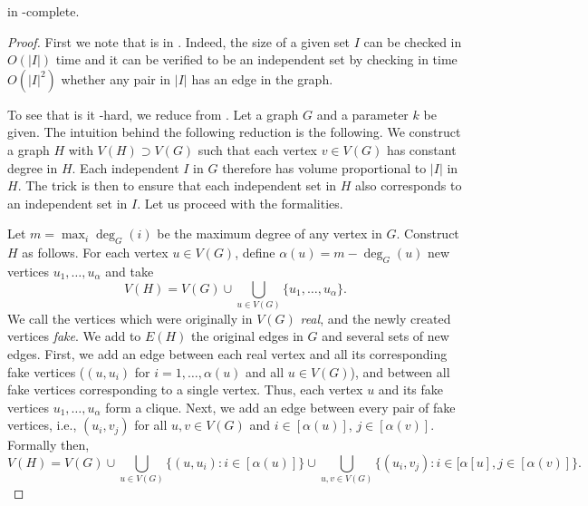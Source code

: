 \begin{lemma}
	\label{lem:vwis}
	\vwis in \NP-complete.
\end{lemma}
\begin{proof}
	First we note that \vwis is in \NP. Indeed, the size of a given set $I$  can be  checked  in  $O(|I|)$ time and it can be verified to be an independent set by checking in time $O(|I|^2)$ whether  any pair  in $|I|$ has an edge  in the  graph. 
	
	To see that is  it \NP-hard, we  reduce from \iset.  Let a graph  $G$ and  a parameter $k$ be  given. The intuition behind  the following reduction is the following. We construct a  graph  $H$ with  $V(H)\supset  V(G)$ such that each vertex $v\in  V(G)$ has constant degree  in $H$.  Each independent $I$ in $G$ therefore has volume proportional to $|I|$ in $H$. The trick is then to ensure that each independent set in  $H$ also corresponds to an  independent set  in $I$. Let us proceed with the formalities. 
	
	Let $m=\max_i\deg_G(i)$  be the maximum degree of any vertex in $G$. Construct $H$ as follows. For each vertex $u\in V(G)$,  define  $\alpha(u)=m-\deg_G(u)$ new vertices  $u_1,\dots,u_\alpha$ and take \[V(H)=V(G)\cup \bigcup_{u\in V(G)} \{u_1,\dots,u_\alpha\}.\]  
	We call the vertices which  were originally in $V(G)$ \emph{real},  and the  newly created vertices \emph{fake}. We  add to $E(H)$ the original  edges in $G$ and several sets  of new  edges. First, we add an edge  between  each real  vertex and all its corresponding fake  vertices ($(u,u_i)$ for $i=1,\dots,\alpha(u)$  and all  $u\in V(G)$), and between all fake vertices  corresponding to a single  vertex. Thus,  each  vertex $u$ and  its  fake  vertices $u_1,\dots,u_\alpha$  form a clique. 
	Next, we add an  edge between  every  pair  of fake vertices, i.e., $(u_i,v_j)$ for  all $u,v\in V(G)$  and $i\in[\alpha(u)]$, $j\in[\alpha(v)]$. Formally then,  
	\begin{equation*}
	V(H) = V(G)	\cup\bigcup_{u\in V (G)}\{(u,u_i):i\in[\alpha(u)]\}\cup\bigcup_{u,v\in V(G)}\{(u_i,v_j):i\in[\alpha[u],j\in[\alpha(v)]\}.
	\end{equation*}
	

\end{proof}
